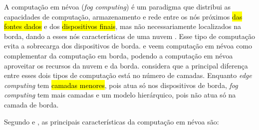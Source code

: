 A computação em névoa (\emph{fog computing}) é um paradigma que distribui
as capacidades de computação, armazenamento e rede entre os nós próximos
\hl{das fontes dados}
e dos \hl{dispositivos finais}, mas não necessariamente localizados na borda,
dando a esses nós características de uma nuvem
\cite{Bonomi2012,Dastjerdi2016,IEEECommunicationsSociety2018}.
Esse tipo de computação evita a sobrecarga dos dispositivos de borda.
 e
 veem computação em névoa como complementar da
computação em borda, podendo a computação em névoa aproveitar os recursos da
nuvem e da borda.
 considera que a
principal diferença entre esses dois tipos de computação está no número de
camadas.
Enquanto \emph{edge computing} tem
\hl{camadas menores}, pois atua só nos
dispositivos de borda, \emph{fog computing} tem mais camadas e um modelo
hierárquico, pois não atua só na camada de borda.

Segundo  e , as principais
características da computação em névoa são:

